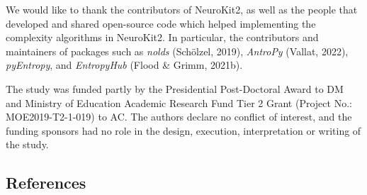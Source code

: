 \documentclass[
  man]{apa6}
\begin{document}
We would like to thank the contributors of NeuroKit2, as well as the people that developed and shared open-source code which helped implementing the complexity algorithms in NeuroKit2. In particular, the contributors and maintainers of packages such as \emph{nolds} (Schölzel, 2019), \emph{AntroPy} (Vallat, 2022), \emph{pyEntropy}, and \emph{EntropyHub} (Flood \& Grimm, 2021b).

The study was funded partly by the Presidential Post-Doctoral Award to DM and Ministry of Education Academic Research Fund Tier 2 Grant (Project No.: MOE2019-T2-1-019) to AC. The authors declare no conflict of interest, and the funding sponsors had no role in the design, execution, interpretation or writing of the study.

\newpage

\hypertarget{references}{%
\subsection{References}\label{references}}
\end{document}
